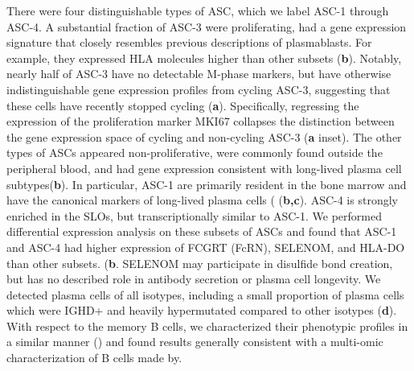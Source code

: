 There were four distinguishable types of ASC, which we label ASC-1 through ASC-4. A substantial fraction of ASC-3 were proliferating, had a gene expression signature that closely resembles previous descriptions of plasmablasts. For example, they expressed HLA molecules higher than other subsets (\textbf{b})\cite{sanz2019challenges}. Notably, nearly half of ASC-3 have no detectable M-phase markers, but have otherwise indistinguishable gene expression profiles from cycling ASC-3, suggesting that these cells have recently stopped cycling (\textbf{a}). Specifically, regressing the expression of the proliferation marker MKI67 collapses the distinction between the gene expression space of cycling and non-cycling ASC-3 (\textbf{a} inset). The other types of ASCs appeared non-proliferative, were commonly found outside the peripheral blood, and had gene expression consistent with long-lived plasma cell subtypes\cite{sanz2019challenges}(\textbf{b}). In particular, ASC-1 are primarily resident in the bone marrow and have the canonical markers of long-lived plasma cells (\cite{halliley2015long} (\textbf{b,c}). ASC-4 is strongly enriched in the SLOs, but transcriptionally similar to ASC-1. We performed differential expression analysis on these subsets of ASCs and found that ASC-1 and ASC-4 had higher expression of FCGRT (FcRN), SELENOM, and HLA-DO than other subsets. (\textbf{b}. SELENOM may participate in disulfide bond creation, but has no described role in antibody secretion or plasma cell longevity. We detected plasma cells of all isotypes, including a small proportion of plasma cells which were IGHD+ and heavily hypermutated compared to other isotypes (\textbf{d}). With respect to the memory B cells, we characterized their phenotypic profiles in a similar manner () and found results generally consistent with a multi-omic characterization of B cells made by\cite{glass2020integrated}.

